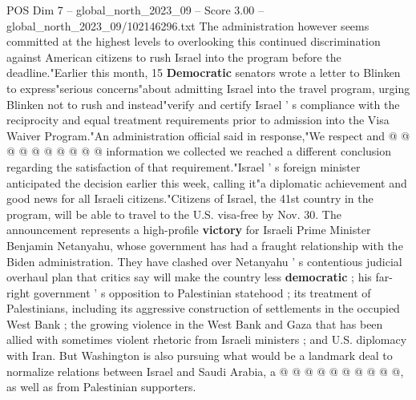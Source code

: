 \begin{textsample}{POS Dim 7 – global\_north\_2023\_09 – Score 3.00 – global\_north\_2023\_09/102146296.txt}
The administration however seems committed at the highest levels to overlooking this continued discrimination against American citizens to rush Israel into the program before the deadline."Earlier this month, 15 \textbf{Democratic} senators wrote a letter to Blinken to express"serious concerns"about admitting Israel into the travel program, urging Blinken not to rush and instead"verify and certify Israel ' s compliance with the reciprocity and equal treatment requirements prior to admission into the Visa Waiver Program."An administration official said in response,"We respect and @ @ @ @ @ @ @ @ @ @ information we collected we reached a different conclusion regarding the satisfaction of that requirement."Israel ' s foreign minister anticipated the decision earlier this week, calling it"a diplomatic achievement and good news for all Israeli citizens."Citizens of Israel, the 41st country in the program, will be able to travel to the U.S. visa-free by Nov. 30.
The announcement represents a high-profile \textbf{victory} for Israeli Prime Minister Benjamin Netanyahu, whose government has had a fraught relationship with the Biden administration.
They have clashed over Netanyahu ' s contentious judicial overhaul plan that critics say will make the country less \textbf{democratic} ; his far-right government ' s opposition to Palestinian statehood ; its treatment of Palestinians, including its aggressive construction of settlements in the occupied West Bank ; the growing violence in the West Bank and Gaza that has been allied with sometimes violent rhetoric from Israeli ministers ; and U.S. diplomacy with Iran.
But Washington is also pursuing what would be a landmark deal to normalize relations between Israel and Saudi Arabia, a @ @ @ @ @ @ @ @ @ @, as well as from Palestinian supporters.

\end{textsample}
